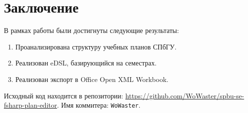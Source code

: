 
\section*{Заключение}

В рамках работы были достигнуты следующие результаты:
\begin{enumerate}
    \item Проанализирована структуру учебных планов СПбГУ.
    \item Реализован eDSL, базирующийся на семестрах.
    \item Реализован экспорт в Office Open XML Workbook.
\end{enumerate}

Исходный код находится в репозитории: \url{https://github.com/WoWaster/spbu-se-fsharp-plan-editor}.
Имя коммитера: \texttt{WoWaster}.
